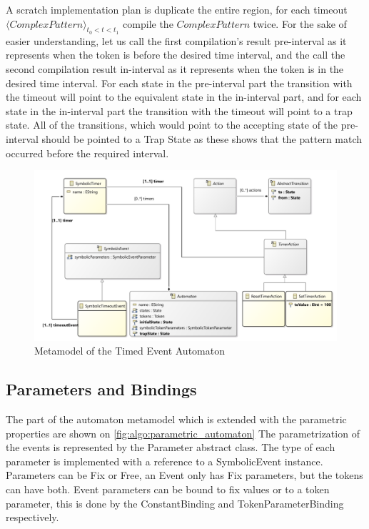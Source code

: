 A scratch implementation plan is duplicate the entire region, for each timeout \\ $\langle \mathit{Complex Pattern} \rangle_{t_0 < t < t_1}$ compile the $\mathit{ComplexPattern}$ twice. For the sake of easier understanding, let us call the first compilation's result  pre-interval as it represents when the token is before the desired time interval, and the call the second compilation result in-interval as it represents when the token is in the desired time interval. For each state in the pre-interval part the transition with the timeout will point to the equivalent state in the in-interval part, and for each state in the in-interval part the transition with the timeout will point to a trap state. All of the transitions, which would point to the accepting state of the pre-interval should be pointed to a Trap State as these shows that the pattern match occurred before the required interval.
  
\begin{figure}[h]
	\centering
	\includegraphics[width=\linewidth]{figures/chapter_5/Timing_diagram}
	\caption{Metamodel of the Timed Event Automaton}
	\label{fig:algo:timed_automaton}
\end{figure}

\subsection{Parameters and Bindings}

The part of the automaton metamodel which is extended with the parametric properties are shown on \cref{fig:algo:parametric_automaton}
The parametrization of the events is represented by the Parameter abstract class. The type of each parameter is implemented with a reference to a SymbolicEvent instance. Parameters can be Fix or Free, an Event only has Fix parameters, but the tokens can have both. Event parameters can be bound to fix values or to a token parameter, this is done by the ConstantBinding and TokenParameterBinding respectively.


